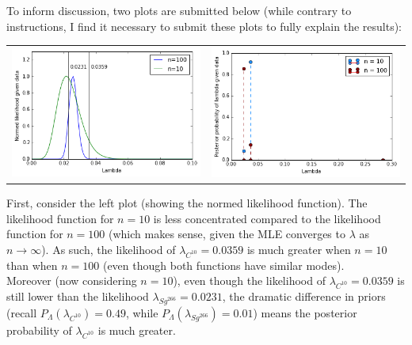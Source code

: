 \documentclass[paper=a4, fontsize=11pt]{scrartcl} %
\numberwithin{equation}{section} %
\numberwithin{figure}{section} %
\numberwithin{table}{section} %
\begin{document}
To inform discussion, two plots are submitted below (while contrary to instructions, I find it necessary to submit these plots to fully explain the results):
\begin{center}
   \begin{tabular}{ c c }
      \includegraphics[scale=0.5]{Q2e_fig2} & \includegraphics[scale=0.5]{Q2e_fig1}\\
   \end{tabular}
\end{center}

First, consider the left plot (showing the normed likelihood function). The likelihood function for $n = 10$ is less concentrated compared to the likelihood function for $n=100$ (which makes sense, given the MLE converges to $\lambda$ as $n \to \infty$). As such, the likelihood of $\lambda_{C^{10}} = 0.0359$ is much greater when $n=10$ than when $n=100$ (even though both functions have similar modes).\\

Moreover (now considering $n=10$), even though the likelihood of $\lambda_{C^{10}} = 0.0359$ is still lower than the likelihood $\lambda_{Sg^{266}} = 0.0231$, the dramatic difference in priors (recall $P_{\Lambda}(\lambda_{C^{10}}) = 0.49$, while $P_{\Lambda}(\lambda_{Sg^{266}}) = 0.01$) means the posterior probability of $\lambda_{C^{10}}$ is much greater.\\
\end{document}
